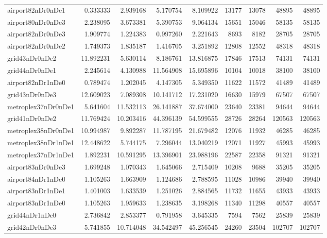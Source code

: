 \begin{longtable}{|l|r|r|r|r|r|r|r|r|}
airport82nDr0nDe1 & 0.333333 & 2.939168 & 5.170754 & 8.109922 & 13177 & 13078 & 48895 & 48895 \\
airport80nDr0nDe3 & 2.238095 & 3.673381 & 5.390753 & 9.064134 & 15651 & 15046 & 58135 & 58135 \\
airport82nDr0nDe3 & 1.909774 & 1.224383 & 0.997260 & 2.221643 & 8693 & 8182 & 28705 & 28705 \\
airport82nDr0nDe2 & 1.749373 & 1.835187 & 1.416705 & 3.251892 & 12808 & 12552 & 48318 & 48318 \\
grid43nDr0nDe2 & 11.892231 & 5.630114 & 8.186761 & 13.816875 & 17846 & 17513 & 74131 & 74131 \\
grid44nDr0nDe1 & 2.245614 & 4.130988 & 11.564908 & 15.695896 & 10104 & 10018 & 38100 & 38100 \\
airport82nDr1nDe0 & 0.789474 & 1.202045 & 4.147305 & 5.349350 & 11622 & 11572 & 41489 & 41489 \\
grid43nDr0nDe3 & 12.609023 & 7.089308 & 10.141712 & 17.231020 & 16630 & 15979 & 67507 & 67507 \\
metroplex37nDr0nDe1 & 5.641604 & 11.532113 & 26.141887 & 37.674000 & 23640 & 23381 & 94644 & 94644 \\
grid41nDr0nDe2 & 11.769424 & 10.203416 & 44.396139 & 54.599555 & 28726 & 28264 & 120563 & 120563 \\
metroplex38nDr0nDe1 & 10.994987 & 9.892287 & 11.787195 & 21.679482 & 12076 & 11932 & 46285 & 46285 \\
metroplex38nDr1nDe1 & 12.448622 & 5.744175 & 7.296044 & 13.040219 & 12071 & 11927 & 45993 & 45993 \\
metroplex37nDr1nDe1 & 1.892231 & 10.591295 & 13.396901 & 23.988196 & 22587 & 22358 & 91321 & 91321 \\
airport83nDr0nDe3 & 1.699248 & 1.070343 & 1.645066 & 2.715409 & 10208 & 9688 & 35205 & 35205 \\
airport84nDr1nDe0 & 1.105263 & 1.663909 & 1.124686 & 2.788595 & 11028 & 10986 & 39940 & 39940 \\
airport83nDr1nDe1 & 1.401003 & 1.633539 & 1.251026 & 2.884565 & 11732 & 11655 & 43933 & 43933 \\
airport83nDr1nDe0 & 1.105263 & 1.959633 & 1.238635 & 3.198268 & 11340 & 11298 & 40557 & 40557 \\
grid44nDr1nDe0 & 2.736842 & 2.853377 & 0.791958 & 3.645335 & 7594 & 7562 & 25839 & 25839 \\
grid42nDr0nDe3 & 5.741855 & 10.714048 & 34.542497 & 45.256545 & 24260 & 23504 & 102707 & 102707 \\

\end{longtable}
